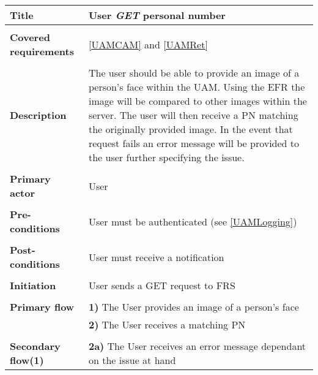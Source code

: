 \documentclass[a4paper,11pt]{article}
\begin{document}
\begin{tabular}{|p{3.5cm}|p{11.5cm}|} \hline
    \textbf{Title} &  User \emph{GET} personal number

    \\ \hline \rowcolor{Gray} & \\ \hline

    \textbf{Covered requirements} &  \ref{UAMCAM} and \ref{UAMRet}

    \\ \hline \rowcolor{Gray} & \\ \hline

    \textbf{Description} &  The user should be able to provide an image of a person's face within the UAM. Using the EFR the image will be compared to other images within the server. The user will then receive a PN matching the originally provided image. In the event that request fails an error message will be provided to the user further specifying the issue.

    \\ \hline \rowcolor{Gray} & \\ \hline

    \textbf{Primary actor} & User

    \\ \hline \rowcolor{Gray} & \\ \hline

    \textbf{Pre-conditions} &   User must be authenticated (see \ref{UAMLogging})

    \\ \hline \rowcolor{Gray} & \\ \hline

    \textbf{Post-conditions} &   User must receive a notification

    \\ \hline \rowcolor{Gray} & \\ \hline

    \textbf{Initiation} & User sends a GET request to FRS

    \\ \hline \rowcolor{Gray} & \\ \hline

    \textbf{Primary flow} &
    \textbf{1)} The User provides an image of a person's face \\&
    \textbf{2)} The User receives a matching PN

    \\ \hline \rowcolor{Gray} & \\ \hline

    \textbf{Secondary flow(1)} &
    \textbf{2a)} The User receives an error message dependant on the issue at hand

    \\ \hline
\end{tabular}
\end{document}
